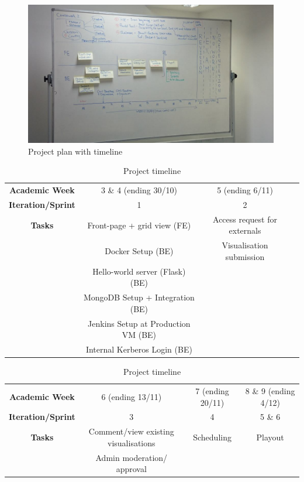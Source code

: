 \documentclass[a4paper]{article}
\begin{document}
\begin{figure}[h]
  \centering
    \includegraphics[width = 0.99\textwidth]{./planning/timeline.jpg}
   
  \caption{Project plan with timeline}
  \label{fig:timeline}
\end{figure}


\begin{table}[h]
  \begin{tabular}{c | c | c | c }
    \textbf{Academic Week} & 3 \& 4 (ending 30/10) & 5 (ending 6/11) \\
    \textbf{Iteration/Sprint} & 1 & 2 \\ \hline
    \textbf{Tasks} & Front-page + grid view (FE) & Access request for externals \\
          & Docker Setup (BE)           & Visualisation submission \\
          & Hello-world server (Flask) (BE) & \\
          & MongoDB Setup + Integration (BE) & \\
          & Jenkins Setup at Production VM (BE) & \\
          & Internal Kerberos Login (BE) & \\
  \end{tabular}

  \vspace{30pt}
  \begin{tabular}{c | c | c | c }
    \textbf{Academic Week} & 6 (ending 13/11) & 7 (ending 20/11) & 8 \& 9 (ending 4/12) \\
    \textbf{Iteration/Sprint} & 3 & 4 & 5 \& 6 \\ \hline
    \textbf{Tasks} & Comment/view existing visualisations & Scheduling &  Playout \\
          & Admin moderation/ approval &  \\
  \end{tabular}
  \caption{Project timeline}
  \label{table:timeline}
\end{table}
\end{document}
